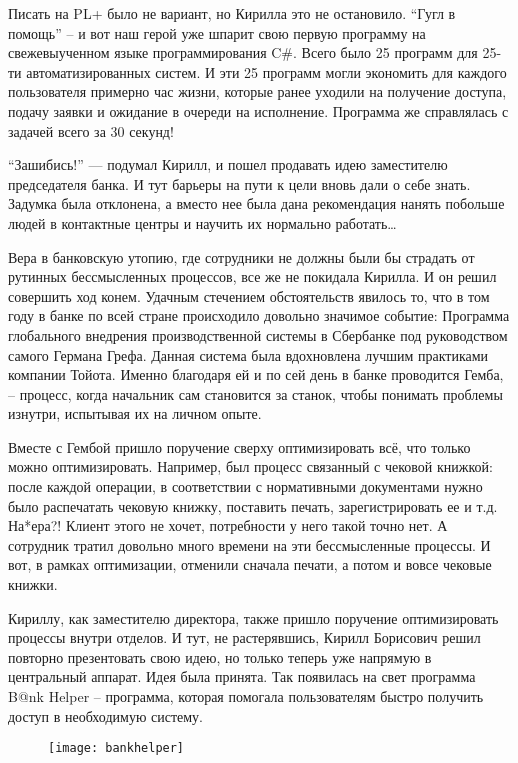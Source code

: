 \documentclass[../index.tex]{subfiles}
\begin{document}
Писать на PL+ было не вариант, но Кирилла это не остановило. “Гугл в помощь” -- и вот наш герой уже шпарит свою первую программу на свежевыученном языке программирования C\#. Всего было 25 программ для 25-ти автоматизированных систем. И эти 25 программ могли экономить для каждого пользователя примерно час жизни, которые ранее уходили на получение доступа, подачу заявки и ожидание в очереди на исполнение. Программа же справлялась с задачей всего за 30 секунд!

“Зашибись!” — подумал Кирилл, и пошел продавать идею заместителю председателя банка. И тут барьеры на пути к цели вновь дали о себе знать. Задумка была отклонена, а вместо нее была дана рекомендация нанять побольше людей в контактные центры и научить их нормально работать…

Вера в банковскую утопию, где сотрудники не должны были бы страдать от рутинных бессмысленных процессов, все же не покидала Кирилла. И он решил совершить ход конем. Удачным стечением обстоятельств явилось то, что в том году в банке по всей стране происходило довольно значимое событие: Программа глобального внедрения производственной системы в Сбербанке под руководством самого Германа Грефа. Данная система была вдохновлена лучшим практиками компании Тойота. Именно благодаря ей и по сей день в банке проводится Гемба, -- процесс, когда начальник сам становится за станок, чтобы понимать проблемы изнутри, испытывая их на личном опыте.

Вместе с Гембой пришло поручение сверху оптимизировать всё, что только можно оптимизировать. Например, был процесс связанный с чековой книжкой: после каждой операции, в соответствии с нормативными документами нужно было распечатать чековую книжку, поставить печать, зарегистрировать ее и т.д. На*ера?! Клиент этого не хочет, потребности у него такой точно нет. А сотрудник тратил довольно много времени на эти бессмысленные процессы.  И вот, в рамках оптимизации, отменили сначала печати, а потом и вовсе чековые книжки.

Кириллу, как заместителю директора, также пришло поручение оптимизировать процессы внутри отделов. И тут, не растерявшись, Кирилл Борисович решил повторно презентовать свою идею, но только теперь уже напрямую в центральный аппарат. Идея была принята. Так появилась на свет программа B@nk Helper -- программа, которая помогала пользователям быстро получить доступ в необходимую систему.

\begin{figure}[h]
\texttt{[image: bankhelper]}
\centering
\end{figure}
\end{document}
